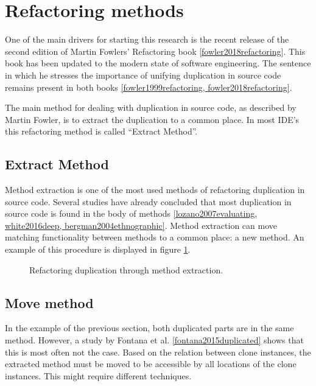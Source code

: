 \section{Refactoring methods}
One of the main drivers for starting this research is the recent release of the second edition of Martin Fowlers' Refactoring book \ref{fowler2018refactoring}. This book has been updated to the modern state of software engineering. The sentence in which he stresses the importance of unifying duplication in source code remains present in both books \ref{fowler1999refactoring, fowler2018refactoring}.

The main method for dealing with duplication in source code, as described by Martin Fowler, is to extract the duplication to a common place. In most IDE's this refactoring method is called ``Extract Method''.

\subsection{Extract Method}
Method extraction is one of the most used methods of refactoring duplication in source code. Several studies have already concluded that most duplication in source code is found in the body of methods \ref{lozano2007evaluating, white2016deep, bergman2004ethnographic}. Method extraction can move matching functionality between methods to a common place: a new method. An example of this procedure is displayed in figure \ref{fig:extractmethod}.

\begin{figure}[H]
\begin{parcolumns}{2}
\end{parcolumns}
\caption{Refactoring duplication through method extraction.}
\label{fig:extractmethod}
\end{figure}

\subsection{Move method}
In the example of the previous section, both duplicated parts are in the same method. However, a study by Fontana et al. \ref{fontana2015duplicated} shows that this is most often not the case. Based on the relation between clone instances, the extracted method must be moved to be accessible by all locations of the clone instances. This might require different techniques.

